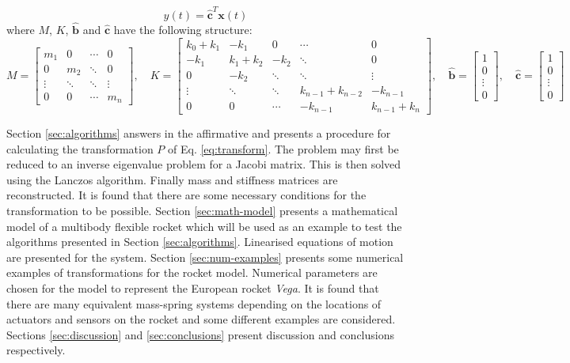 \documentclass{mbd_fullpaper}
\begin{document}
\begin{equation}
y(t) = \mathbf{\hat{c}}^T \mathbf{x}(t)
\label{eq:ms2}
\end{equation}
where $M$, $K$, $\mathbf{\hat{b}}$ and $\mathbf{\hat{c}}$ have the following structure:
\begin{equation}
M = \begin{bmatrix}
m_1  &  0 & \cdots & 0 \\
0 & m_2  & \ddots & 0 \\
\vdots & \ddots & \ddots & \vdots \\
0 & 0 & \cdots & m_n \end{bmatrix}
, \quad
K = \begin{bmatrix}
k_0+k_1  &  -k_1 & 0 & \cdots & 0 \\
-k_1 & k_1+k_2  & -k_2 & \ddots & 0 \\
0 & -k_2 & \ddots & \ddots & \vdots \\
\vdots & \ddots & \ddots & k_{n-1}+k_{n-2} & -k_{n-1} \\
0 & 0 & \cdots & -k_{n-1} &  k_{n-1} + k_n \end{bmatrix}
,\quad \mathbf{\hat{b}} = \begin{bmatrix} 1 \\ 0 \\ \vdots \\ 0 \end{bmatrix}
,\quad \mathbf{\hat{c}} = \begin{bmatrix} 1 \\ 0 \\ \vdots \\ 0 \end{bmatrix}
\label{eq:ms3}
\end{equation}

Section \ref{sec:algorithms} answers in the affirmative and presents a procedure for calculating the transformation $P$ of Eq. \ref{eq:transform}.
The problem may first be reduced to an inverse eigenvalue problem for a Jacobi matrix.
This is then solved using the Lanczos algorithm.
Finally mass and stiffness matrices are reconstructed.
It is found that there are some necessary conditions for the transformation to be possible.
Section \ref{sec:math-model} presents a mathematical model of a multibody flexible rocket which will be used as an example to test the algorithms presented in Section \ref{sec:algorithms}.
Linearised equations of motion are presented for the system.
Section \ref{sec:num-examples} presents some numerical examples of transformations for the rocket model.
Numerical parameters are chosen for the model to represent the European rocket \emph{Vega}.
It is found that there are many equivalent mass-spring systems depending on the locations of actuators and sensors on the rocket and some different examples are considered.
Sections \ref{sec:discussion} and \ref{sec:conclusions} present discussion and conclusions respectively.
\end{document}
